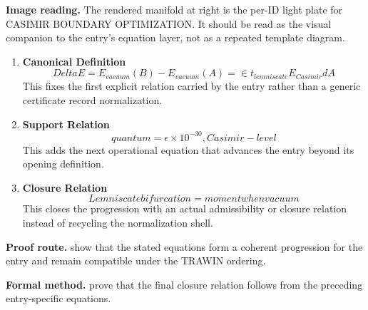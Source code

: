 \begin{samepage}
\noindent\begin{minipage}[t]{0.45\linewidth}
\vspace{0pt}
\raggedright
\scriptsize\textbf{Image reading.} The rendered manifold at right is the per-ID light plate for CASIMIR BOUNDARY OPTIMIZATION. It should be read as the visual companion to the entry's equation layer, not as a repeated template diagram.\par
\end{minipage}\hfill
\begin{minipage}[t]{0.53\linewidth}
\vspace*{-0.10in}
\raggedright
{}
\end{minipage}
\end{samepage}

\clearpage


\begin{enumerate}[leftmargin=1.6em,itemsep=9pt,topsep=6pt]
\item \textbf{Canonical Definition}
\[
Delta E = E_{vacuum}(B) - E_{vacuum}(A) = \in t_{lemniscate} E_{Casimir} dA
\]
This fixes the first explicit relation carried by the entry rather than a generic certificate record normalization.

\item \textbf{Support Relation}
\[
quantum = \epsilon \times 10^{-30}, Casimir-level
\]
This adds the next operational equation that advances the entry beyond its opening definition.

\item \textbf{Closure Relation}
\[
Lemniscate bifurcation = moment when vacuum
\]
This closes the progression with an actual admissibility or closure relation instead of recycling the normalization shell.
\end{enumerate}

\textbf{Proof route.} show that the stated equations form a coherent progression for the entry and remain compatible under the TRAWIN ordering.

\textbf{Formal method.} prove that the final closure relation follows from the preceding entry-specific equations.

\medskip
{}

